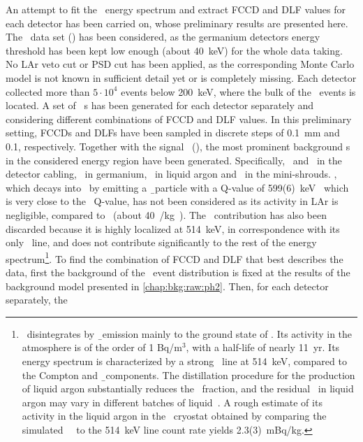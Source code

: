 An attempt to fit the \Arl\ energy spectrum and extract FCCD and DLF values for each
detector has been carried on, whose preliminary results are presented here. The
\phasetwop\ data set (\gexpophasetwopbkg) has been considered, as the germanium detectors
energy threshold has been kept low enough (about 40~keV) for the whole data taking. No LAr
veto cut or PSD cut has been applied, as the corresponding Monte Carlo model is not known
in sufficient detail yet or is completely missing. Each detector collected more than $5
\cdot 10^4$ events below 200~keV, where the bulk of the \Arl\ events is located.
\newpar
A set of \Arl\ \pdf{}s has been generated for each detector separately and considering
different combinations of FCCD and DLF values. In this preliminary setting, FCCDs and DLFs
have been sampled in discrete steps of 0.1~mm and 0.1, respectively. Together with the
signal \pdf\ (\Arl), the most prominent background \pdf{}s in the considered energy region have
been generated.  Specifically, \Pbh\ and \Bih\ in the detector cabling, \nnbb\ in
germanium, \kvz\ in liquid argon and \kvn\ in the mini-shrouds. \Arh, which decays into
\kvz\ by emitting a \b\ particle with a Q-value of 599(6)~keV~\cite{Wang2017} which is
very close to the \Arl\ Q-value, has not been considered as its activity in LAr is
negligible, compared to \Arl\ (about 40~\mubq/kg~\cite{Ajaj2019}). The \Kr\
contribution has also been discarded because it is highly localized at 514~keV, in
correspondence with its only \g\ line, and does not contribute significantly to the rest
of the energy spectrum\footnote{%
  \Kr\ disintegrates by \b\ emission mainly to the ground state of . Its
  activity in the atmosphere is of the order of 1 Bq/m$^3$, with a half-life of nearly
  11~yr. Its energy spectrum is characterized by a strong \g\ line at 514~keV, compared to
  the Compton and \b\ components. The distillation procedure for the production of liquid
  argon substantially reduces the \Kr\ fraction, and the residual \Kr\ in liquid argon may
  vary in different batches of liquid~\cite{Benetti2006}. A rough estimate of its
  activity in the liquid argon in the \gerda\ cryostat obtained by comparing the simulated
  \Kr\ \pdf\ to the 514~keV line count rate yields 2.3(3)~mBq/kg.
}. To find the
combination of FCCD and DLF that best describes the data, first the background of
the \Arl\ event distribution is fixed at the results of the background model
presented in \cref{chap:bkg:raw:ph2}. Then, for each detector separately, the \Arl\
